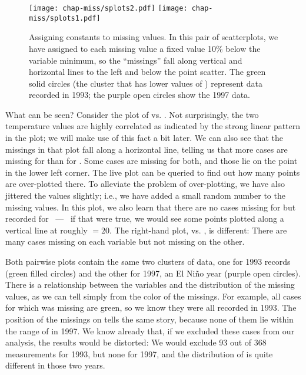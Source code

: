 
\begin{figure}[htbp]
\centerline{\texttt{[image: chap-miss/splots2.pdf]}
            \texttt{[image: chap-miss/splots1.pdf]}}
\caption[Assigning constants to missing values]{Assigning constants
to missing values.  In this pair of scatterplots, we have assigned to
each missing value a fixed value 10\% below the variable minimum, so
the ``missings'' fall along vertical and horizontal lines to the left
and below the point scatter.  The green solid circles (the cluster
that has lower values of ) represent data
recorded in 1993; the purple open circles show the 1997 data.}
\label{missing}
\end{figure}

What can be seen?  Consider the plot of  vs.
.  Not surprisingly, the two temperature
values are highly correlated as indicated by the strong linear pattern
in the plot; we will make use of this fact a bit later. We can also
see that the missings in that plot fall along a horizontal line,
telling us that more cases are missing for  than
for .  Some cases are missing for both,
and those lie on the point in the lower left corner.  The live plot
can be queried to find out how many points are over-plotted there. To
alleviate the problem of over-plotting, we have also jittered the values
slightly; i.e., we have added a small random number to the missing
values.  In this plot, we also learn that there are no cases missing
for  but recorded for  ~---~ if that were true, we would see some points plotted
along a vertical line at roughly  $ =
20$.  The right-hand plot,  vs. , is
different: There are many cases missing on each variable but not
missing on the other.

Both pairwise plots contain the same two clusters of data, one for
1993 records (green filled circles) and the other for 1997, an El
Ni\~no year (purple open circles).  There is a relationship between
the variables and the distribution of the missing values, as we can
tell simply from the color of the missings.  For example, all
cases for which  was missing are green, so we know they
were all recorded in 1993.  The position of the missings on
 tells the same story, because none of them lie within
the range of  in 1997.  We know already that, if we
excluded these cases from our analysis, the results would be
distorted: We would exclude 93 out of 368 measurements for 1993, but
none for 1997, and the distribution of  is quite
different in those two years.

